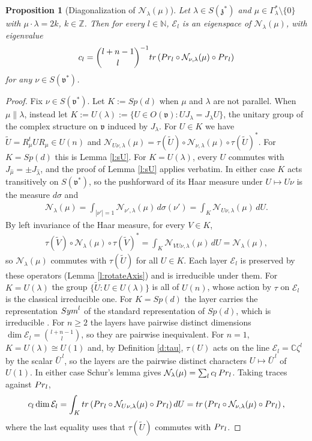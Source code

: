 \documentclass[11pt]{amsart}
\theoremstyle{plain}
\newtheorem{proposition}[theorem]{Proposition}
\theoremstyle{definition}
\theoremstyle{remark}
\numberwithin{equation}{section}
\def\fz{\mathfrak{z}}
\def\fv{\mathfrak{v}}
\def\cE{\mathcal{E}}
\def\cN{\mathcal{N}}
\def\mz{\setminus\{0\}}
\def\C{{\mathbb C}}%
\def\N{{\mathbb N}}%
\def\Z{{\mathbb Z}}%
\numberwithin{equation}{section}
\begin{document}
\begin{proposition}[Diagonalization of $\cN_\lambda(\mu)$]\label{p:avgDiag}
	Let $\lambda\in S(\fz^*)$ and $\mu\in \Gamma_\lambda^*\mz$ with $\mu\cdot\lambda=2k$, $k\in \Z$. Then for every $l\in \N$, $\cE_l$ is an eigenspace of $\cN_\lambda(\mu)$, with eigenvalue
	\begin{align}\label{e:avgTrace}
		c_l=\binom{l+n-1}{l}^{-1}{\rm tr}\left({\rm Pr}_l\circ\cN_{\nu, \lambda}(\mu)\circ{\rm Pr}_l\right)
	\end{align}
	for any $\nu\in S(\fv^*)$.
\end{proposition}
\begin{proof}
	Fix $\nu\in S(\fv^*)$. Let 
    $K:=Sp(d)$ when $\mu$ and $\lambda$ are not parallel. When $\mu\parallel\lambda$, instead let $K:=U(\lambda):=\{U\in O(\fv): UJ_\lambda=J_\lambda U\}$, the unitary group of the complex structure on $\fv$ induced by $J_\lambda$. For $U\in K$ we have $\widetilde U=R_\mu^tUR_\mu\in U(n)$ and $\cN_{U\nu, \lambda}(\mu)=\tau(\widetilde U)\circ\cN_{\nu, \lambda}(\mu)\circ\tau(\widetilde U)^*$. For $K=Sp(d)$ this is Lemma \ref{l:sU}. For $K=U(\lambda)$, every $U$ commutes with $J_{\hat\mu}=\pm J_{\hat\lambda}$, and the proof of Lemma \ref{l:sU} applies verbatim. In either case $K$ acts transitively on $S(\fv^*)$, so the pushforward of its Haar measure under $U\mapsto U\nu$ is the measure $d\sigma$ and
	\begin{align*}
		\cN_\lambda(\mu)=\int_{|\nu'|=1}\cN_{\nu', \lambda}(\mu)\,d\sigma(\nu')=\int_{K}\cN_{U\nu, \lambda}(\mu)\,dU.
	\end{align*}
	By left invariance of the Haar measure, for every $V\in K$,
	\begin{align*}
		\tau(\widetilde V)\circ\cN_\lambda(\mu)\circ\tau(\widetilde V)^*=\int_{K}\cN_{VU\nu, \lambda}(\mu)\,dU=\cN_\lambda(\mu),
	\end{align*}
	so $\cN_\lambda(\mu)$ commutes with $\tau(\widetilde U)$ for all $U\in K$. Each layer $\cE_l$ is preserved by these operators (Lemma \ref{l:rotateAxis}) and is irreducible under them. For $K=U(\lambda)$ the group $\{\widetilde U: U\in U(\lambda)\}$ is all of $U(n)$, whose action by $\tau$ on $\cE_l$ is the classical irreducible one. For $K=Sp(d)$ the layer carries the representation ${\rm Sym}^l$ of the standard representation of $Sp(d)$, which is irreducible \cite[Ch.~17]{fultonRepresentationTheory1991}. For $n\geq 2$ the layers have pairwise distinct dimensions $\dim\cE_l=\binom{l+n-1}{l}$, so they are pairwise inequivalent. For $n=1$, $K=U(\lambda)\cong U(1)$ and, by Definition \ref{d:tau}, $\tau(U)$ acts on the line $\cE_l=\C\zeta^l$ by the scalar $\bar{U}^{\,l}$, so the layers are the pairwise distinct characters $U\mapsto\bar{U}^{\,l}$ of $U(1)$. In either case Schur's lemma gives $\cN_\lambda(\mu)=\sum_{l}c_l\,{\rm Pr}_l$. Taking traces against ${\rm Pr}_l$,
	\begin{align*}
		c_l\dim\cE_l=\int_{K}{\rm tr}\left({\rm Pr}_l\circ\cN_{U\nu, \lambda}(\mu)\circ{\rm Pr}_l\right)dU={\rm tr}\left({\rm Pr}_l\circ\cN_{\nu, \lambda}(\mu)\circ{\rm Pr}_l\right),
	\end{align*}
	where the last equality uses that $\tau(\widetilde U)$ commutes with ${\rm Pr}_l$.
\end{proof}
\end{document}
